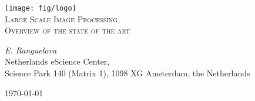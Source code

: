 \documentclass[a4paper,11pt]{article}
\begin{document}
\begin{titlepage}
\begin{center}
\texttt{[image: fig/logo]}\\[3cm]    
\textsc{\LARGE Large Scale Image Processing}\\[0.5cm]
\textsc{\large Overview of the state of the art}\\[0.5cm]
\vfill
\end{center}
{\large
\emph{E. Ranguelova} \\

}
{\large
{Netherlands eScience Center, \\
Science Park 140 (Matrix 1), 1098 XG Amsterdam, the Netherlands\\
}
}
\begin{center}
{\large \today}
\end{center}
\end{titlepage}

\tableofcontents

\newpage


%

%

%

%

%

%
\end{document}
